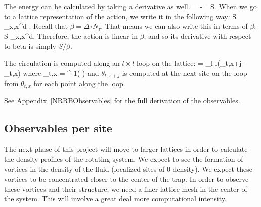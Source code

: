 The energy can be calculated by taking a derivative as well. 
%
\beq
{} = -\frac{\partial}{\partial \beta}\ln \CZ = \frac{\partial}{\partial \beta}S.
\eeq
%
When we go to a lattice representation of the action, we write it in the following way:
%
\beq
S \rightarrow \sum_{x,\tau}\Delta x^{d} \Delta \tau {}.
\eeq 
%
Recall that $\beta = \Delta \tau N_{\tau}$. That means we can also write this in terms of $\beta$:
%
\beq
S \rightarrow {}\sum_{x,\tau}\Delta x^{d}\beta {}.
\eeq 
%
Therefore, the action is linear in $\beta$, and so its derivative with respect to beta is simply $S/\beta$. 

The circulation is computed along an $l \times l$ loop on the lattice:
\beq
\Gamma[l] = \sum_{l \times l}\left(\theta_{t,x+j} - \theta_{t,x}\right) 
\eeq
where 
\beq
\theta_{t,x} = \tan^{-1}\left( \right)
\eeq
and $\theta_{t,x+j}$ is computed at the next site on the loop from $\theta_{t,x}$ for each point along the loop.

See Appendix~\ref{NRRBObservables} for the full derivation of the observables.

\subsection{Observables per site}
The next phase of this project will move to larger lattices in order to calculate the density profiles of the rotating system. We expect to see the formation of vortices in the density of the fluid (localized sites of $0$ density). We expect these vortices to be concentrated closer to the center of the trap. In order to observe these vortices and their structure, we need a finer lattice mesh in the center of the system. This will involve a great deal more computational intensity.
